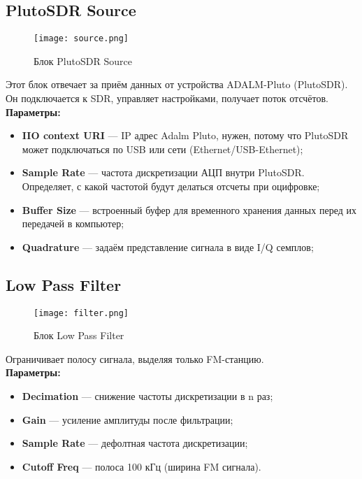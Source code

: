 \subsection*{\textbf{PlutoSDR Source}}

\begin{figure}[H]
    \centering
    \texttt{[image: source.png]}
    \caption{Блок PlutoSDR Source}
\end{figure}

Этот блок отвечает за приём данных от устройства ADALM-Pluto (PlutoSDR). Он подключается к SDR, управляет настройками, получает поток отсчётов. \\

\textbf{Параметры:}

\begin{itemize}
    \item \textbf{IIO context URI} — IP адрес Adalm Pluto, нужен, потому что PlutoSDR может подключаться по USB или сети (Ethernet/USB-Ethernet);
    \item \textbf{Sample Rate} — частота дискретизации АЦП внутри PlutoSDR. Определяет, с какой частотой будут делаться отсчеты при оцифровке;
    \item \textbf{Buffer Size} — встроенный буфер для временного хранения данных перед их передачей в компьютер;
    \item \textbf{Quadrature} — задаём представление сигнала в виде I/Q семплов;
\end{itemize}

\subsection*{\textbf{Low Pass Filter}}

\begin{figure}[H]
    \centering
    \texttt{[image: filter.png]}
    \caption{Блок Low Pass Filter}
\end{figure}

Ограничивает полосу сигнала, выделяя только FM-станцию. \\

\textbf{Параметры:}

\begin{itemize}
    \item \textbf{Decimation} — снижение частоты дискретизации в n раз;
    \item \textbf{Gain} — усиление амплитуды после фильтрации;
    \item \textbf{Sample Rate} — дефолтная частота дискретизации;
    \item \textbf{Cutoff Freq} — полоса 100 кГц (ширина FM сигнала).
\end{itemize}

